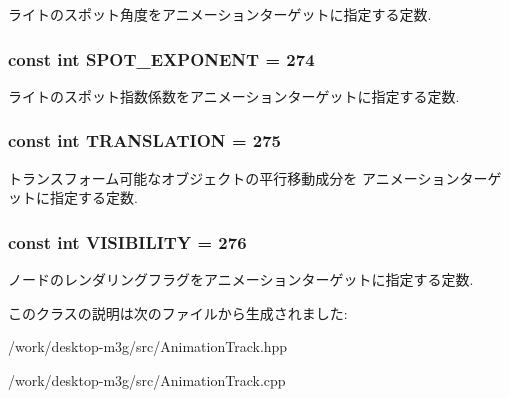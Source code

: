 ライトのスポット角度をアニメーションターゲットに指定する定数. \hypertarget{classm3g_1_1AnimationTrack_90c55bd356e55166244416c6f758ea94}{
\subsubsection[{SPOT\_\-EXPONENT}]{\setlength{\rightskip}{0pt plus 5cm}const int {\bf SPOT\_\-EXPONENT} = 274}}
\label{classm3g_1_1AnimationTrack_90c55bd356e55166244416c6f758ea94}


ライトのスポット指数係数をアニメーションターゲットに指定する定数. \hypertarget{classm3g_1_1AnimationTrack_a691826dccd8c22144e61216de4f680c}{
\subsubsection[{TRANSLATION}]{\setlength{\rightskip}{0pt plus 5cm}const int {\bf TRANSLATION} = 275}}
\label{classm3g_1_1AnimationTrack_a691826dccd8c22144e61216de4f680c}


トランスフォーム可能なオブジェクトの平行移動成分を アニメーションターゲットに指定する定数. \hypertarget{classm3g_1_1AnimationTrack_f248c44b5d4962472c6533cdeffc6fe9}{
\subsubsection[{VISIBILITY}]{\setlength{\rightskip}{0pt plus 5cm}const int {\bf VISIBILITY} = 276}}
\label{classm3g_1_1AnimationTrack_f248c44b5d4962472c6533cdeffc6fe9}


ノードのレンダリングフラグをアニメーションターゲットに指定する定数. 

このクラスの説明は次のファイルから生成されました:\begin{CompactItemize}
\item 
/work/desktop-m3g/src/AnimationTrack.hpp\item 
/work/desktop-m3g/src/AnimationTrack.cpp\end{CompactItemize}

